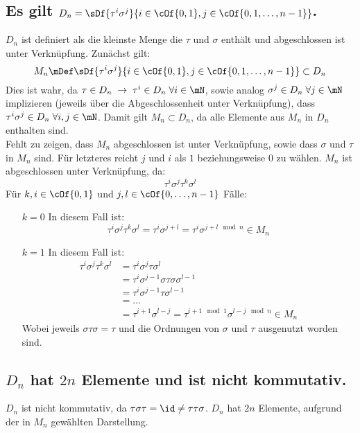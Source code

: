 \documentclass[11pt,a4paper]{scrartcl}
\begin{document}
\subsection{Es gilt $D_n = \sDf{\tau^i\sigma^j}{i\in\cOf{0,1}, j\in\cOf{0,1,\dots,n-1}}$.}
$D_n$ ist definiert als die kleinste Menge die $\tau$ und $\sigma$ enthält und abgeschlossen ist unter Verknüpfung. Zunächst gilt:
\begin{equation}
	M_n \mDef \sDf{\tau^i\sigma^j}{i\in\cOf{0,1}, j\in\cOf{0,1,\dots,n-1}} \subset D_n
\end{equation}
Dies ist wahr, da $\tau\in D_n\;\rightarrow\;\tau^i\in D_n\;\forall i \in \mN$, sowie analog $\sigma^j\in D_n\;\forall j \in \mN$ implizieren (jeweils über die Abgeschlossenheit unter Verknüpfung), dass $\tau^i\sigma^j\in D_n\;\forall i,j\in\mN$. Damit gilt $M_n \subset D_n$, da alle Elemente aus $M_n$ in $D_n$ enthalten sind.\\
Fehlt zu zeigen, dass $M_n$ abgeschlossen ist unter Verknüpfung, sowie dass $\sigma$ und $\tau$ in $M_n$ sind. Für letzteres reicht $j$ und $i$ als $1$ beziehungsweise $0$ zu wählen. $M_n$ ist abgeschlossen unter Verknüpfung, da:
\begin{equation}
	\tau^i\sigma^j\tau^k\sigma^l
\end{equation}
Für $k,i\in\cOf{0,1}$ und $j,l\in\cOf{0,\dots,n-1}$ Fälle:
\begin{enumerate}
	\item[$k=0$] In diesem Fall ist:
	\begin{equation}
		\tau^i\sigma^j\tau^k\sigma^l = \tau^i\sigma^{j+l} = \tau^i\sigma^{j+l \mod n} \in M_n
	\end{equation}
	\item[$k=1$] In diesem Fall ist:
	\begin{align}
		\tau^i\sigma^j\tau^k\sigma^l & = \tau^i\sigma^j\tau\sigma^l\\
		& = \tau^i\sigma^{j-1}\sigma\tau\sigma\sigma^{l-1}\\
		& = \tau^i\sigma^{j-1}\tau\sigma^{l-1}\\
		& = \dots \\
		& = \tau^{i+1}\sigma^{l-j} = \tau^{i+1 \mod 1}\sigma^{l-j \mod n} \in M_n 
	\end{align}
	Wobei jeweils $\sigma\tau\sigma = \tau$ und die Ordnungen von $\sigma$ und $\tau$ ausgenutzt worden sind.
\end{enumerate}

\subsection{$D_n$ hat $2n$ Elemente und ist nicht kommutativ.}
$D_n$ ist nicht kommutativ, da $\tau\sigma\tau = \id \neq \tau\tau\sigma$. $D_n$ hat $2n$ Elemente, aufgrund der in $M_n$ gewählten Darstellung.
\end{document}
